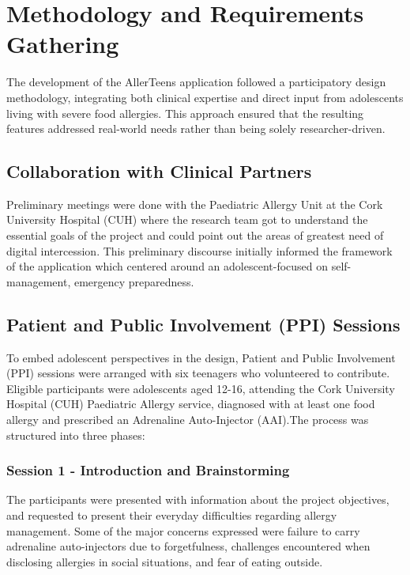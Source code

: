 \documentclass[MScCS]{uccthesis}
\begin{document}
\chapter{Methodology and Requirements Gathering}
\label{chap:methodology}

The development of the AllerTeens application followed a participatory design methodology, integrating both clinical expertise and direct input from adolescents living with severe food allergies. This approach ensured that the resulting features addressed real-world needs rather than being solely researcher-driven.

\section{Collaboration with Clinical Partners}
Preliminary meetings were done with the Paediatric Allergy Unit at the Cork University Hospital (CUH) where the research team got to understand the essential goals of the project and could point out the areas of greatest need of digital intercession. This preliminary discourse initially informed the framework of the application which centered around an adolescent-focused on self-management, emergency preparedness.

\section{Patient and Public Involvement (PPI) Sessions}
\label{sec:ppi-sessions}
To embed adolescent perspectives in the design, Patient and Public Involvement (PPI) sessions were arranged with six teenagers who volunteered to contribute. Eligible participants were adolescents aged 12-16, attending the Cork University Hospital (CUH) Paediatric Allergy service, diagnosed with at least one food allergy and prescribed an Adrenaline Auto-Injector (AAI).The process was structured into three phases:

\subsection*{Session 1 - Introduction and Brainstorming}
The participants were presented with information about the project objectives, and requested to present their everyday difficulties regarding allergy management. Some of the major concerns expressed were failure to carry adrenaline auto-injectors due to forgetfulness, challenges encountered when disclosing allergies in social situations, and fear of eating outside.
\end{document}
